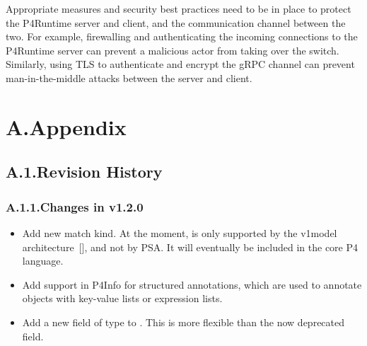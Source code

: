 \documentclass[11pt]{article}
\begin{document}
{%
\noindent{}Appropriate measures and security best practices need to be in place to protect
the P4Runtime server and client, and the communication channel between the two.
For example, firewalling and authenticating the incoming connections to the
P4Runtime server can prevent a malicious actor from taking over the switch.
Similarly, using TLS to authenticate and encrypt the gRPC channel can prevent
man-in-the-middle attacks between the server and client.%

\section{A.\hspace*{0.5em}Appendix}\label{sec-appendix}%

\subsection{A.1.\hspace*{0.5em}Revision History}\label{sec-revision-history}%

\subsubsection{A.1.1.\hspace*{0.5em}Changes in v1.2.0}\label{sec-changes-in-v120}%

\begin{itemize}[noitemsep,topsep=\mdcompacttopsep]%

\item{}Add new  match kind. At the moment,  is only supported by
the v1model architecture~[], and not by PSA. It will eventually be
included in the core P4 language.%

\item{}Add support in P4Info for structured annotations, which are used to annotate
objects with key-value lists or expression lists.%

\item{}Add a new  field of type  to . This is more
flexible than the now deprecated  field.%


\end{itemize}}
\end{document}
